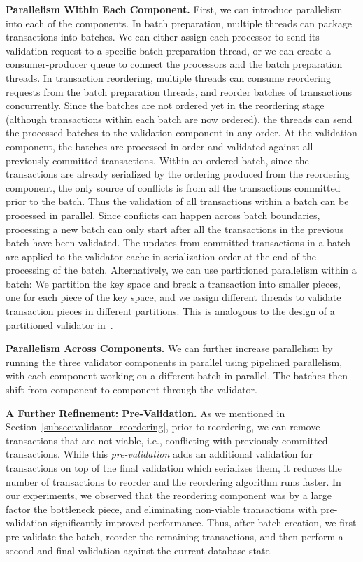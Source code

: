 {\bf Parallelism Within Each Component.}
First, we can introduce parallelism into each of the components. In batch preparation, multiple threads can package transactions into batches. We can either assign each processor to send its validation request to a specific batch preparation thread, or we can create a consumer-producer queue to connect the processors and the batch preparation threads. In transaction reordering, multiple threads can consume reordering requests from the batch preparation threads, and reorder batches of transactions concurrently. Since the batches are not ordered yet in the reordering stage (although transactions within each batch are now ordered), the threads can send the processed batches to the validation component in any order. At the validation component, the batches are processed in order and validated against all previously committed transactions. 
Within an ordered batch, since the transactions are already serialized by the ordering produced from the reordering component, the only source of conflicts is from all the transactions committed prior to the batch. Thus the validation of all transactions within a batch can be processed in parallel. Since conflicts can happen across batch boundaries, processing a new batch can only start after all the transactions in the previous batch have been validated. The updates from committed transactions in a batch are applied to the validator cache in serialization order at the end of the processing of the batch. Alternatively, we can use partitioned parallelism within a batch: We partition the key space and break a transaction into smaller pieces, one for each piece of the key space, and we assign different threads to validate transaction pieces in different partitions. This is analogous to the design of a partitioned validator in~\cite{ding2015centiman}.


{\bf Parallelism Across Components.}
We can further increase parallelism by running the three validator components in parallel using pipelined parallelism, 
with each component working on a different batch in parallel. The batches then shift from component to component through the validator.

{\bf A Further Refinement: Pre-Validation.} As we mentioned in Section~\ref{subsec:validator_reordering}, prior to reordering, we can remove transactions that are not viable, i.e., conflicting with previously committed transactions. While this \emph{pre-validation} adds an additional validation for transactions on top of the final validation which serializes them, it reduces the number of transactions to reorder and the reordering algorithm runs faster. In our experiments, we observed that the reordering component was by a large factor the bottleneck piece, and eliminating non-viable transactions with pre-validation significantly improved performance. Thus, after batch creation, we first pre-validate the batch, reorder the remaining transactions, and then perform a second and final validation against the current database state.

